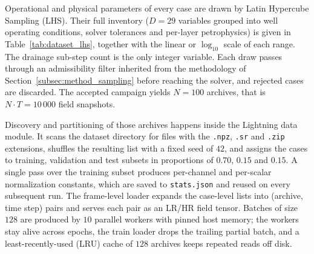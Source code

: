 Operational and physical parameters of every case are drawn by Latin Hypercube Sampling (LHS). Their full inventory ($D = 29$ variables grouped into well operating conditions, solver tolerances and per-layer petrophysics) is given in Table~\ref{tab:dataset_lhs}, together with the linear or $\log_{10}$ scale of each range. The drainage sub-step count is the only integer variable. Each draw passes through an admissibility filter inherited from the methodology of Section~\ref{subsec:method_sampling} before reaching the solver, and rejected cases are discarded. The accepted campaign yields $N = 100$ archives, that is $N \cdot T = 10\,000$ field snapshots.

Discovery and partitioning of those archives happens inside the Lightning data module. It scans the dataset directory for files with the \texttt{.npz}, \texttt{.sr} and \texttt{.zip} extensions, shuffles the resulting list with a fixed seed of $42$, and assigns the cases to training, validation and test subsets in proportions of $0.70$, $0.15$ and $0.15$. A single pass over the training subset produces per-channel and per-scalar normalization constants, which are saved to \texttt{stats.json} and reused on every subsequent run. The frame-level loader expands the case-level lists into (archive, time step) pairs and serves each pair as an LR/HR field tensor. Batches of size $128$ are produced by $10$ parallel workers with pinned host memory; the workers stay alive across epochs, the train loader drops the trailing partial batch, and a least-recently-used (LRU) cache of $128$ archives keeps repeated reads off disk.


